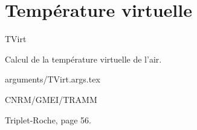 %
\section{Temp\'erature virtuelle }

 {\sf TVirt}

Calcul de la temp\'erature virtuelle de l'air.

\bigskip
 {arguments/TVirt.args.tex}




CNRM/GMEI/TRAMM

Triplet-Roche\cite{Triplet-Roche}, page 56.
